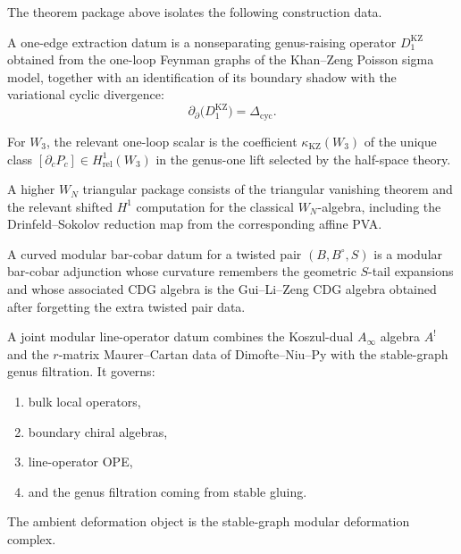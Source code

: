 The theorem package above isolates the following construction data.

\begin{definition}
A one-edge extraction datum is a nonseparating genus-raising operator
\(D_1^{\mathrm{KZ}}\) obtained from the one-loop Feynman graphs of the
Khan--Zeng Poisson sigma model, together with an identification of its
boundary shadow with the variational cyclic divergence:
\[
\partial_{\partial}\bigl(D_1^{\mathrm{KZ}}\bigr)
=\Delta_{\mathrm{cyc}}.
\]
\end{definition}

\begin{definition}
For \(W_3\), the relevant one-loop scalar is the coefficient
\(\kappa_{\mathrm{KZ}}(W_3)\) of the unique class
\([\partial_cP_c]\in H^1_{\mathrm{rel}}(W_3)\) in the genus-one lift
selected by the half-space theory.
\end{definition}

\begin{definition}
A higher \(W_N\) triangular package consists of the triangular
vanishing theorem and the relevant shifted \(H^1\) computation for the
classical \(W_N\)-algebra, including the Drinfeld--Sokolov reduction
map from the corresponding affine PVA.
\end{definition}

\begin{definition}
A curved modular bar-cobar datum for a twisted pair \((B,B^\circ,S)\)
is a modular bar-cobar adjunction whose curvature remembers the
geometric \(S\)-tail expansions and whose associated CDG algebra is the
Gui--Li--Zeng CDG algebra obtained after forgetting the extra twisted
pair data.
\end{definition}

\begin{definition}
A joint modular line-operator datum combines the Koszul-dual
\(A_\infty\) algebra \(A^!\) and the \(r\)-matrix Maurer--Cartan data
of Dimofte--Niu--Py \cite{DNP25} with the stable-graph genus filtration.
It governs:
\begin{enumerate}[leftmargin=2.4em]
\item bulk local operators,
\item boundary chiral algebras,
\item line-operator OPE,
\item and the genus filtration coming from stable gluing.
\end{enumerate}
The ambient deformation object is the stable-graph modular deformation
complex.
\end{definition}

